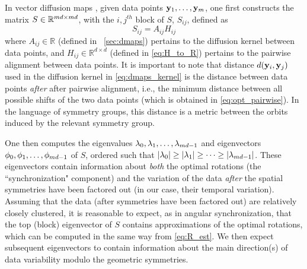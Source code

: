 In vector diffusion maps \cite{singer2012vector}, given data points $\mathbf{y}_1, \dots, \mathbf{y}_m$, one first constructs the matrix $S \in \mathbb{R}^{m d \times m d}$, with the $i,j^{th}$ block of $S$, $S_{ij}$, defined as
\begin{equation} \label{eq:vdm_S}
	S_{ij} = A_{ij} H_{ij}
\end{equation}
%
where $A_{ij} \in \mathbb{R}$ (defined in \sec~\ref{sec:dmaps}) pertains to the diffusion kernel between data points, and $H_{ij} \in \mathbb{R}^{d \times d}$ (defined in \eqref{eq:H_to_R}) pertains to the pairwise alignment between data points.
%
It is important to note that distance $d(\mathbf{y}_i, \mathbf{y}_j)$ used in the diffusion kernel in \eqref{eq:dmaps_kernel} is the distance between data points {\it after} after pairwise alignment, i.e., the minimum distance between all possible shifts of the two data points (which is obtained in \eqref{eq:opt_pairwise}).
%
In the language of symmetry groups, this distance is a metric between the orbits induced by the relevant symmetry group.

One then computes the eigenvalues $\lambda_0, \lambda_1, \dots, \lambda_{m d-1}$ and eigenvectors $\phi_0, \phi_1, \dots, \phi_{m d-1}$ of $S$, ordered such that $|\lambda_0| \ge |\lambda_1| \ge \dots \ge |\lambda_{m d-1}|$.
%
These eigenvectors contain information about {\it both} the optimal rotations (the ``synchronization" component) and the
variation of the data {\it after} the spatial symmetries have been factored out (in our case, their temporal variation).
%
Assuming that the data (after symmetries have been factored out) are relatively closely clustered, it is reasonable
to expect, as in angular synchronization, that the top (block) eigenvector of $S$ contains approximations of the optimal rotations,
which can be computed in the same way from \eqref{eq:R_est}.
%
We then expect subsequent eigenvectors to contain information about the main direction(s) of data variability modulo the geometric symmetries.

